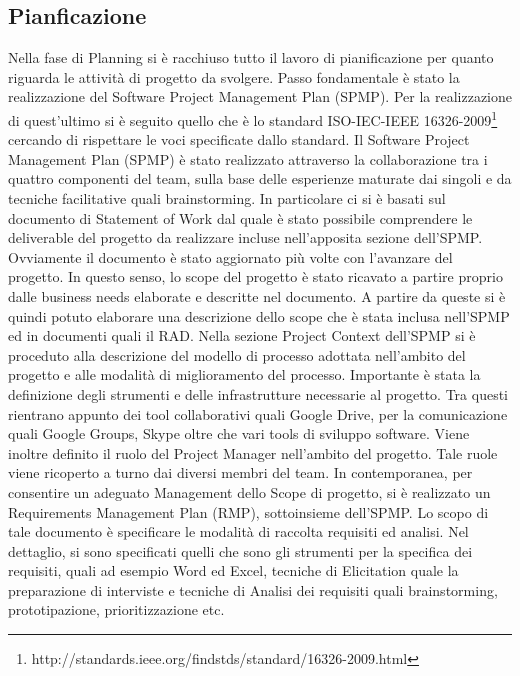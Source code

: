 \subsection{Pianficazione}
Nella fase di Planning si \`{e} racchiuso tutto il lavoro di pianificazione per quanto riguarda le attivit\`{a} di progetto da svolgere. Passo fondamentale \`{e} stato la realizzazione del Software Project Management Plan (SPMP). Per la realizzazione di quest\rq ultimo si \`{e} seguito quello che \`{e} lo standard ISO-IEC-IEEE 16326-2009\footnote{http://standards.ieee.org/findstds/standard/16326-2009.html} cercando di rispettare le voci specificate dallo standard.
Il Software Project Management Plan (SPMP) \`{e} stato realizzato attraverso la collaborazione tra i quattro componenti del team, sulla base delle esperienze maturate dai singoli e da tecniche facilitative quali brainstorming.
In particolare ci si \`{e} basati sul documento di Statement of Work dal quale \`{e} stato possibile comprendere le deliverable del progetto da realizzare incluse nell\rq apposita sezione dell\rq SPMP.
Ovviamente il documento \`{e} stato aggiornato pi\`{u} volte con l\rq avanzare del progetto. In questo senso, lo scope del progetto \`{e} stato ricavato a partire proprio dalle business needs elaborate e descritte nel documento.
A partire da queste si \`{e} quindi potuto elaborare una descrizione dello scope che \`{e} stata inclusa nell\rq SPMP ed in documenti quali il RAD.
Nella sezione Project Context dell\rq SPMP si \`{e} proceduto alla descrizione del modello di processo adottata nell\rq ambito del progetto e alle modalit\`{a} di miglioramento del processo.
Importante \`{e} stata la definizione degli strumenti e delle infrastrutture necessarie al progetto. Tra questi rientrano appunto dei tool collaborativi quali Google Drive, per la comunicazione quali Google Groups, Skype oltre che vari tools di sviluppo software.
Viene inoltre definito il ruolo del Project Manager nell\rq ambito del progetto. Tale ruole viene ricoperto a turno dai diversi membri del team.
In contemporanea, per consentire un adeguato Management dello Scope di progetto, si \`{e} realizzato un Requirements Management Plan (RMP), sottoinsieme dell\rq SPMP. Lo scopo di tale documento \`{e} specificare le modalit\`{a} di raccolta requisiti ed analisi. 
Nel dettaglio, si sono specificati quelli che sono gli strumenti per la specifica dei requisiti, quali ad esempio Word ed Excel, tecniche di Elicitation quale la preparazione di interviste e tecniche di Analisi dei requisiti quali brainstorming, prototipazione, prioritizzazione etc.
